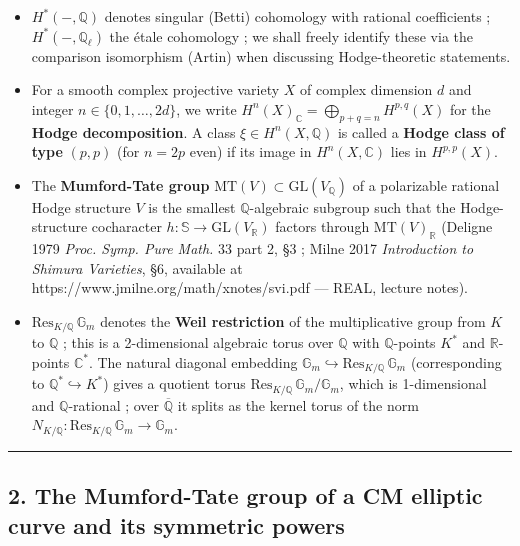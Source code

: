 \documentclass[
  11pt,
  a4paper,
]{article}
\begin{document}
\begin{itemize}
\item
  \(H^*(-, \mathbb{Q})\) denotes singular (Betti) cohomology with rational coefficients ; \(H^*(-, \mathbb{Q}_\ell)\) the étale cohomology ; we shall freely identify these via the comparison isomorphism (Artin) when discussing Hodge-theoretic statements.
\item
  For a smooth complex projective variety \(X\) of complex dimension \(d\) and integer \(n \in \{0, 1, \ldots, 2d\}\), we write \(H^n(X)_\mathbb{C} = \bigoplus_{p + q = n} H^{p, q}(X)\) for the \textbf{Hodge decomposition}. A class \(\xi \in H^n(X, \mathbb{Q})\) is called a \textbf{Hodge class of type} \((p, p)\) (for \(n = 2p\) even) if its image in \(H^n(X, \mathbb{C})\) lies in \(H^{p, p}(X)\).
\item
  The \textbf{Mumford-Tate group} \(\mathrm{MT}(V) \subset \mathrm{GL}(V_\mathbb{Q})\) of a polarizable rational Hodge structure \(V\) is the smallest \(\mathbb{Q}\)-algebraic subgroup such that the Hodge-structure cocharacter \(h : \mathbb{S} \to \mathrm{GL}(V_\mathbb{R})\) factors through \(\mathrm{MT}(V)_\mathbb{R}\) (Deligne 1979 \emph{Proc. Symp. Pure Math.} 33 part 2, §3 ; Milne 2017 \emph{Introduction to Shimura Varieties}, §6, available at https://www.jmilne.org/math/xnotes/svi.pdf --- REAL, lecture notes).
\item
  \(\mathrm{Res}_{K/\mathbb{Q}}\,\mathbb{G}_m\) denotes the \textbf{Weil restriction} of the multiplicative group from \(K\) to \(\mathbb{Q}\) ; this is a 2-dimensional algebraic torus over \(\mathbb{Q}\) with \(\mathbb{Q}\)-points \(K^*\) and \(\mathbb{R}\)-points \(\mathbb{C}^*\). The natural diagonal embedding \(\mathbb{G}_m \hookrightarrow \mathrm{Res}_{K/\mathbb{Q}}\,\mathbb{G}_m\) (corresponding to \(\mathbb{Q}^* \hookrightarrow K^*\)) gives a quotient torus \(\mathrm{Res}_{K/\mathbb{Q}}\,\mathbb{G}_m / \mathbb{G}_m\), which is 1-dimensional and \(\mathbb{Q}\)-rational ; over \(\overline{\mathbb{Q}}\) it splits as the kernel torus of the norm \(N_{K/\mathbb{Q}} : \mathrm{Res}_{K/\mathbb{Q}}\,\mathbb{G}_m \to \mathbb{G}_m\).
\end{itemize}

\begin{center}\rule{0.5\linewidth}{0.5pt}\end{center}

\hypertarget{the-mumford-tate-group-of-a-cm-elliptic-curve-and-its-symmetric-powers}{%
\subsection{2. The Mumford-Tate group of a CM elliptic curve and its symmetric powers}\label{the-mumford-tate-group-of-a-cm-elliptic-curve-and-its-symmetric-powers}}
\end{document}
